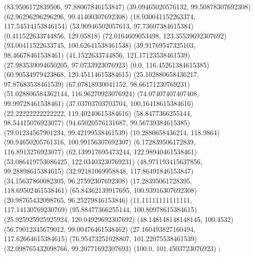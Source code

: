 {{{		(83.9506172839506, 97.88067846153847)
		(39.09465020576132, 99.50878307692308)
		(62.96296296296296, 99.41400307692308)
		(18.930041152263374, 117.54514153846154)
		(53.90946502057613, 97.73607384615384)
		(0.411522633744856, 129.05818)
		(72.0164609053498, 123.35539692307692)
		(93.00411522633745, 100.62641538461538)
		(39.91769547325103, 98.46678461538461)
		(41.1522633744856, 121.17123538461539)
		(27.983539094650205, 97.0733923076923)
		(0.0, 116.45261384615385)
		(60.90534979423868, 120.45114615384615)
		(25.102880658436217, 97.87683538461539)
		(67.07818930041152, 98.66171230769231)
		(51.028806584362144, 116.96270923076924)
		(74.07407407407408, 99.99728461538461)
		(37.03703703703704, 100.16418615384616)
		(22.22222222222222, 119.40240615384616)
		(58.8477366255144, 98.54415076923077)
		(94.65020576131687, 99.56739384615385)
		(79.01234567901234, 99.42199538461539)
		(10.2880658436214, 118.9864)
		(90.94650205761316, 100.99156307692307)
		(6.172839506172839, 116.8913276923077)
		(62.139917695473244, 122.98940461538461)
		(53.086419753086425, 122.03403230769231)
		(48.971193415637856, 99.28898615384615)
		(32.92181069958848, 117.86491846153847)
		(34.15637860082305, 96.27592307692308)
		(17.28395061728395, 118.69502461538461)
		(65.84362139917695, 100.93916307692308)
		(20.98765432098765, 96.25279846153846)
		(11.11111111111111, 117.14130769230769)
		(95.88477366255144, 100.80978615384615)
		(25.925925925925924, 120.04929692307692)
		(48.148148148148145, 100.4532)
		(56.79012345679012, 99.00476461538462)
		(27.160493827160494, 117.62664615384615)
		(76.95473251028807, 101.22075538461539)
		(32.098765432098766, 99.20771692307693)
		(100.0, 101.4503723076923)
	};

}}
